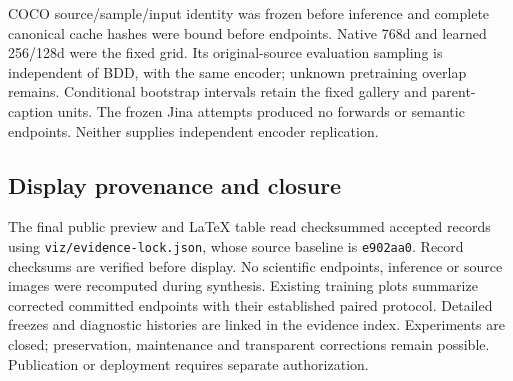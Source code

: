\ours{} COCO source/sample/input identity was frozen before inference and complete
canonical cache hashes were bound before endpoints. Native 768d and learned
256/128d were the fixed grid. Its original-source evaluation sampling is independent
of BDD, with the same encoder; unknown pretraining overlap remains.
Conditional bootstrap intervals retain the fixed gallery and parent-caption units.
The frozen Jina attempts produced no forwards or semantic endpoints. Neither
supplies independent encoder replication.

\subsection{Display provenance and closure}
The final public preview and LaTeX table read checksummed accepted records using
\texttt{viz/evidence-lock.json}, whose source baseline is \texttt{e902aa0}.
Record checksums are verified before display. No scientific endpoints, inference
or source images were recomputed during synthesis. Existing training plots
summarize corrected committed endpoints with their established paired protocol.
Detailed freezes and diagnostic histories are linked in the evidence index.
Experiments are closed; preservation, maintenance and transparent corrections
remain possible. Publication or deployment requires separate authorization.
